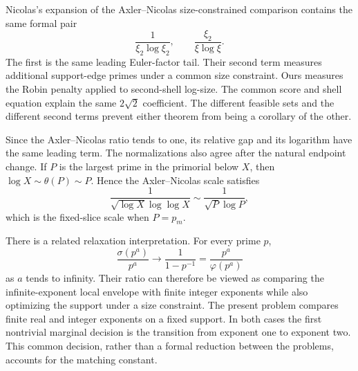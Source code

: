 Nicolas's expansion of the Axler--Nicolas size-constrained comparison
\cite[equations~(5.3)--(5.5)]{nicolas-2025} contains the same formal pair
\[
    \frac1{\xi_2\log\xi_2},
    \qquad
    \frac{\xi_2}{\xi\log\xi}.
\]
The first is the same leading Euler-factor tail. Their second term measures
additional support-edge primes under a common size constraint. Ours measures
the Robin penalty applied to second-shell log-size. The common score and
shell equation explain the same \(2\sqrt2\) coefficient. The different
feasible sets and the different second terms prevent either theorem from
being a corollary of the other.

Since the Axler--Nicolas ratio tends to one, its relative gap and its
logarithm have the same leading term. The normalizations also agree after
the natural endpoint change. If \(P\)
is the largest prime in the primorial below \(X\), then
\(\log X\sim\theta(P)\sim P\). Hence the Axler--Nicolas scale satisfies
\[
    \frac1{\sqrt{\log X}\log\log X}
    \sim
    \frac1{\sqrt P\log P},
\]
which is the fixed-slice scale when \(P=p_m\).

There is a related relaxation interpretation. For every prime \(p\),
\[
    \frac{\sigma(p^a)}{p^a}
    \longrightarrow
    \frac1{1-p^{-1}}
    =
    \frac{p^a}{\varphi(p^a)}
\]
as \(a\) tends to infinity. Their ratio can therefore be viewed as
comparing the infinite-exponent local envelope with finite integer
exponents while also optimizing the support under a size constraint. The
present problem compares finite real and integer exponents on a fixed
support. In both
cases the first nontrivial marginal decision is the transition from
exponent one to exponent two. This common decision, rather than a formal
reduction between the problems, accounts for the matching constant.
